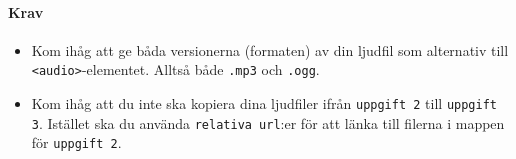 \documentclass[12pt]{article}
\begin{document}
  \paragraph{Krav}
  \begin{itemize}
    \item Kom ihåg att ge båda versionerna (formaten) av din ljudfil som alternativ till \texttt{<audio>}-elementet. Alltså både \texttt{.mp3} och \texttt{.ogg}.
    \item Kom ihåg att du inte ska kopiera dina ljudfiler ifrån \texttt{uppgift 2} till \texttt{uppgift 3}. Istället ska du använda \texttt{relativa url}:er för att länka till filerna i mappen för \texttt{uppgift 2}.
  \end{itemize}
\end{document}
